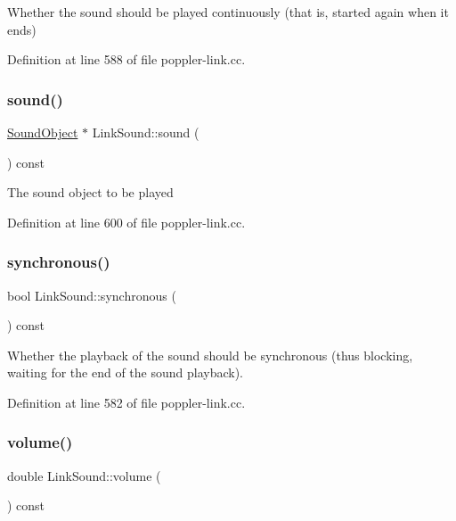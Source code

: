 Whether the sound should be played continuously (that is, started again when it ends) 

Definition at line 588 of file poppler-\/link.\+cc.

\mbox{\label{class_poppler_1_1_link_sound_af44a1f6748f459b776214e910a924cc3}} 
\subsubsection{\texorpdfstring{sound()}{sound()}}
{\footnotesize\ttfamily \hyperlink{class_poppler_1_1_sound_object}{Sound\+Object} $\ast$ Link\+Sound\+::sound (\begin{DoxyParamCaption}{ }\end{DoxyParamCaption}) const}

The sound object to be played 

Definition at line 600 of file poppler-\/link.\+cc.

\mbox{\label{class_poppler_1_1_link_sound_a8e6bd04ee0f7e6aa429d692d9532dd20}} 
\subsubsection{\texorpdfstring{synchronous()}{synchronous()}}
{\footnotesize\ttfamily bool Link\+Sound\+::synchronous (\begin{DoxyParamCaption}{ }\end{DoxyParamCaption}) const}

Whether the playback of the sound should be synchronous (thus blocking, waiting for the end of the sound playback). 

Definition at line 582 of file poppler-\/link.\+cc.

\mbox{\label{class_poppler_1_1_link_sound_ae29321c335e60b265077f37e1839d946}} 
\subsubsection{\texorpdfstring{volume()}{volume()}}
{\footnotesize\ttfamily double Link\+Sound\+::volume (\begin{DoxyParamCaption}{ }\end{DoxyParamCaption}) const}

